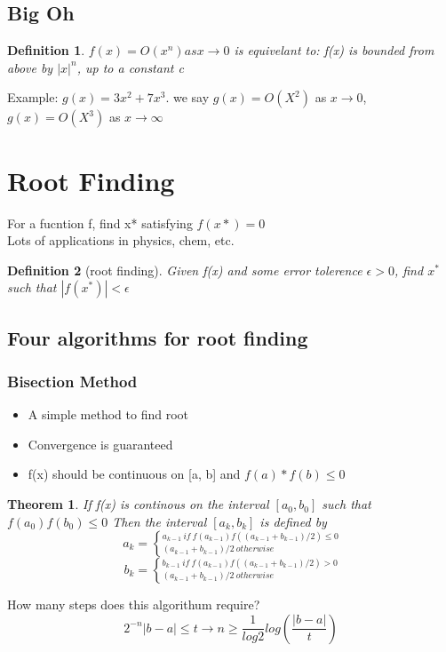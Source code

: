 \documentclass[10pt]{article}
\theoremstyle{break}
\newtheorem{thm}{Theorem}[subsection]
\newtheorem{defn}{Definition}[subsection]
\begin{document}
{    \subsection{Big Oh}
        \begin{defn}
            $f(x)=O(x^n) as x \rightarrow 0$ is equivelant to:
            f(x) is bounded from above by $|x|^n$, up to a constant c
        \end{defn}
        Example:
        $g(x)=3x^2+7x^3$. we say $g(x)=O(X^2)$ as $x \rightarrow 0$,
        $g(x)=O(X^3)$ as $x \rightarrow \infty$
\section{Root Finding}
    For a fucntion f, find x* satisfying $f(x*)=0$\\
    Lots of applications in physics, chem, etc.
    \begin{defn}[root finding]
        Given f(x) and some error tolerence $\epsilon >0$, find $x^*$ such that $|f(x^*)|<\epsilon$
    \end{defn}
    \subsection{Four algorithms for root finding}
        \subsubsection{Bisection Method}
            \begin{itemize}
                \item A simple method to find root 
                \item Convergence is guaranteed 
                \item f(x) should be continuous on [a, b] and $f(a)*f(b) \leq 0$
            \end{itemize}
            \begin{thm}
                If f(x) is continous on the interval $[a_0, b_0]$ such that $f(a_0)f(b_0) \leq 0$ 
                Then the interval $[a_k, b_k]$ is defined by 
                {\Large
                $$a_k=\left\{^{a_{k-1} \ if\ f(a_{k-1})f((a_{k-1}+b_{k-1})/2) \leq 0}_{(a_{k-1}+b_{k-1})/2 \ otherwise}\right.$$
                $$b_k=\left\{^{b_{k-1} \ if\ f(a_{k-1})f((a_{k-1}+b_{k-1})/2) > 0}_{(a_{k-1}+b_{k-1})/2\ otherwise}\right.$$
    }
            \end{thm}
            How many steps does this algorithum require?
            $$2^{-n}|b-a| \leq t \rightarrow n \geq \frac{1}{log2}log(\frac{|b-a|}{t})$$
}
\end{document}
